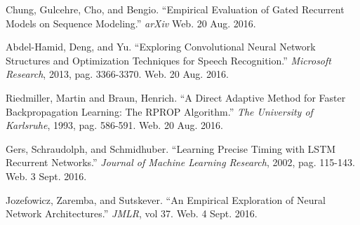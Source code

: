 \documentclass{article}
\begin{document}
\begin{thebibliography}{9}
		Chung, Gulcehre, Cho, and Bengio. ``Empirical Evaluation of Gated
		Recurrent Models on Sequence Modeling.'' \textit{arXiv} Web. 20 Aug.
		2016.

		Abdel-Hamid, Deng, and Yu. ``Exploring Convolutional Neural Network
		Structures and Optimization Techniques for Speech Recognition.''
		\textit{Microsoft Research}, 2013, pag. 3366-3370. Web. 20 Aug. 2016.

		Riedmiller, Martin and Braun, Henrich. ``A Direct Adaptive Method for
		Faster Backpropagation Learning: The RPROP Algorithm.'' \textit{The
		University of Karlsruhe}, 1993, pag. 586-591. Web. 20 Aug. 2016.

		Gers, Schraudolph, and Schmidhuber. ``Learning Precise Timing with LSTM
		Recurrent Networks.'' \textit{Journal of Machine Learning Research},
		2002, pag. 115-143. Web. 3 Sept. 2016.

		Jozefowicz, Zaremba, and Sutskever. ``An Empirical Exploration of Neural
		Network Architectures.'' \textit{JMLR}, vol 37. Web. 4 Sept. 2016.
\end{thebibliography}
\end{document}
